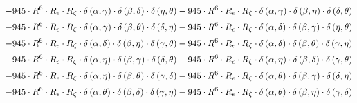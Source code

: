 \begin{subequations}
\begin{gather}
 \\[0.2em] \notag 		 - 945 \cdot R^{6} \cdot R_{\epsilon{}} \cdot R_{\zeta{}} \cdot \delta{}\left(\alpha{}, \gamma{}\right) \cdot \delta{}\left(\beta{}, \delta{}\right) \cdot \delta{}\left(\eta{}, \theta{}\right)- 945 \cdot R^{6} \cdot R_{\epsilon{}} \cdot R_{\zeta{}} \cdot \delta{}\left(\alpha{}, \gamma{}\right) \cdot \delta{}\left(\beta{}, \eta{}\right) \cdot \delta{}\left(\delta{}, \theta{}\right) 
 \\[0.2em] \notag 		 - 945 \cdot R^{6} \cdot R_{\epsilon{}} \cdot R_{\zeta{}} \cdot \delta{}\left(\alpha{}, \gamma{}\right) \cdot \delta{}\left(\beta{}, \theta{}\right) \cdot \delta{}\left(\delta{}, \eta{}\right)- 945 \cdot R^{6} \cdot R_{\epsilon{}} \cdot R_{\zeta{}} \cdot \delta{}\left(\alpha{}, \delta{}\right) \cdot \delta{}\left(\beta{}, \gamma{}\right) \cdot \delta{}\left(\eta{}, \theta{}\right) 
 \\[0.2em] \notag 		 - 945 \cdot R^{6} \cdot R_{\epsilon{}} \cdot R_{\zeta{}} \cdot \delta{}\left(\alpha{}, \delta{}\right) \cdot \delta{}\left(\beta{}, \eta{}\right) \cdot \delta{}\left(\gamma{}, \theta{}\right)- 945 \cdot R^{6} \cdot R_{\epsilon{}} \cdot R_{\zeta{}} \cdot \delta{}\left(\alpha{}, \delta{}\right) \cdot \delta{}\left(\beta{}, \theta{}\right) \cdot \delta{}\left(\gamma{}, \eta{}\right) 
 \\[0.2em] \notag 		 - 945 \cdot R^{6} \cdot R_{\epsilon{}} \cdot R_{\zeta{}} \cdot \delta{}\left(\alpha{}, \eta{}\right) \cdot \delta{}\left(\beta{}, \gamma{}\right) \cdot \delta{}\left(\delta{}, \theta{}\right)- 945 \cdot R^{6} \cdot R_{\epsilon{}} \cdot R_{\zeta{}} \cdot \delta{}\left(\alpha{}, \eta{}\right) \cdot \delta{}\left(\beta{}, \delta{}\right) \cdot \delta{}\left(\gamma{}, \theta{}\right) 
 \\[0.2em] \notag 		 - 945 \cdot R^{6} \cdot R_{\epsilon{}} \cdot R_{\zeta{}} \cdot \delta{}\left(\alpha{}, \eta{}\right) \cdot \delta{}\left(\beta{}, \theta{}\right) \cdot \delta{}\left(\gamma{}, \delta{}\right)- 945 \cdot R^{6} \cdot R_{\epsilon{}} \cdot R_{\zeta{}} \cdot \delta{}\left(\alpha{}, \theta{}\right) \cdot \delta{}\left(\beta{}, \gamma{}\right) \cdot \delta{}\left(\delta{}, \eta{}\right) 
 \\[0.2em] \notag 		 - 945 \cdot R^{6} \cdot R_{\epsilon{}} \cdot R_{\zeta{}} \cdot \delta{}\left(\alpha{}, \theta{}\right) \cdot \delta{}\left(\beta{}, \delta{}\right) \cdot \delta{}\left(\gamma{}, \eta{}\right)- 945 \cdot R^{6} \cdot R_{\epsilon{}} \cdot R_{\zeta{}} \cdot \delta{}\left(\alpha{}, \theta{}\right) \cdot \delta{}\left(\beta{}, \eta{}\right) \cdot \delta{}\left(\gamma{}, \delta{}\right) 

\end{gather}
\end{subequations}
